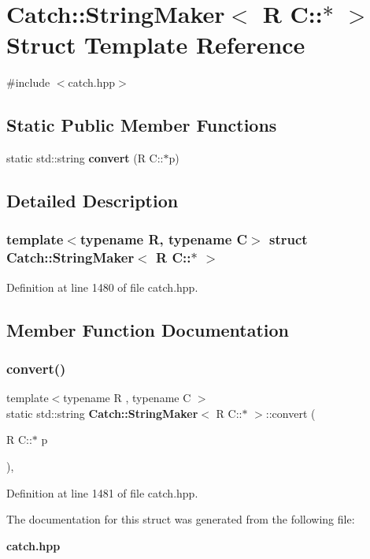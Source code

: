 \section{Catch\+::String\+Maker$<$ R C\+::$\ast$ $>$ Struct Template Reference}
\label{struct_catch_1_1_string_maker_3_01_r_01_c_1_1_5_01_4}


{\ttfamily \#include $<$catch.\+hpp$>$}

\subsection*{Static Public Member Functions}
\begin{DoxyCompactItemize}
\item 
static std\+::string \textbf{ convert} (R C\+::$\ast$p)
\end{DoxyCompactItemize}


\subsection{Detailed Description}
\subsubsection*{template$<$typename R, typename C$>$\newline
struct Catch\+::\+String\+Maker$<$ R C\+::$\ast$ $>$}



Definition at line 1480 of file catch.\+hpp.



\subsection{Member Function Documentation}
\mbox{\label{struct_catch_1_1_string_maker_3_01_r_01_c_1_1_5_01_4_af69c15e0b406e945777137fe4a333731}} 
\subsubsection{convert()}
{\footnotesize\ttfamily template$<$typename R , typename C $>$ \\
static std\+::string \textbf{ Catch\+::\+String\+Maker}$<$ R C\+::$\ast$ $>$\+::convert (\begin{DoxyParamCaption}\item[{R C\+::$\ast$}]{p }\end{DoxyParamCaption})\hspace{0.3cm}{\ttfamily [inline]}, {\ttfamily [static]}}



Definition at line 1481 of file catch.\+hpp.



The documentation for this struct was generated from the following file\+:\begin{DoxyCompactItemize}
\item 
\textbf{ catch.\+hpp}\end{DoxyCompactItemize}
